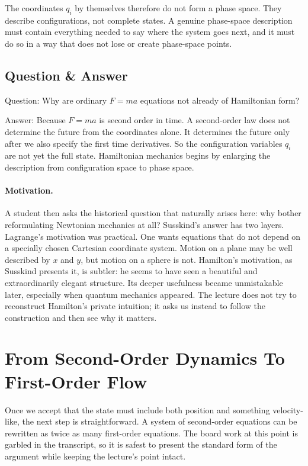 The coordinates \(q_i\) by themselves therefore do not form a phase space. They describe configurations, not complete states. A genuine phase-space description must contain everything needed to say where the system goes next, and it must do so in a way that does not lose or create phase-space points.

\subsection{Question \& Answer}

Question: Why are ordinary \(F=ma\) equations not already of Hamiltonian form?

Answer: Because \(F=ma\) is second order in time. A second-order law does not determine the future from the coordinates alone. It determines the future only after we also specify the first time derivatives. So the configuration variables \(q_i\) are not yet the full state. Hamiltonian mechanics begins by enlarging the description from configuration space to phase space.

\paragraph{Motivation.}
A student then asks the historical question that naturally arises here: why bother reformulating Newtonian mechanics at all? Susskind's answer has two layers. Lagrange's motivation was practical. One wants equations that do not depend on a specially chosen Cartesian coordinate system. Motion on a plane may be well described by \(x\) and \(y\), but motion on a sphere is not. Hamilton's motivation, as Susskind presents it, is subtler: he seems to have seen a beautiful and extraordinarily elegant structure. Its deeper usefulness became unmistakable later, especially when quantum mechanics appeared. The lecture does not try to reconstruct Hamilton's private intuition; it asks us instead to follow the construction and then see why it matters.

\section{From Second-Order Dynamics To First-Order Flow}

Once we accept that the state must include both position and something velocity-like, the next step is straightforward. A system of second-order equations can be rewritten as twice as many first-order equations. The board work at this point is garbled in the transcript, so it is safest to present the standard form of the argument while keeping the lecture's point intact.

